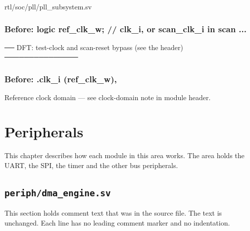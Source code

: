\begin{relocated}{rtl/soc/pll/pll_subsystem.sv}

\subsection*{Before: logic ref\_clk\_w;        // clk\_i, or scan\_clk\_i in scan ...}

\begin{textblock}
── DFT: test-clock and scan-reset bypass (see the header) ───────────────
\end{textblock}

\subsection*{Before: .clk\_i       (ref\_clk\_w),}

\begin{textblock}
Reference clock domain — see clock-domain note in module header.
\end{textblock}

\end{relocated}





\chapter{Peripherals}\label{tm:ch:mod-peripherals}

This chapter describes how each module in this area works. The area holds the UART, the SPI, the timer and the other bus peripherals.

\section{\texttt{periph/dma\_engine.sv}}\label{tm:mod:dma-engine}

This section holds comment text that was in the source file. The text is unchanged. Each line has no leading comment marker and no indentation.

